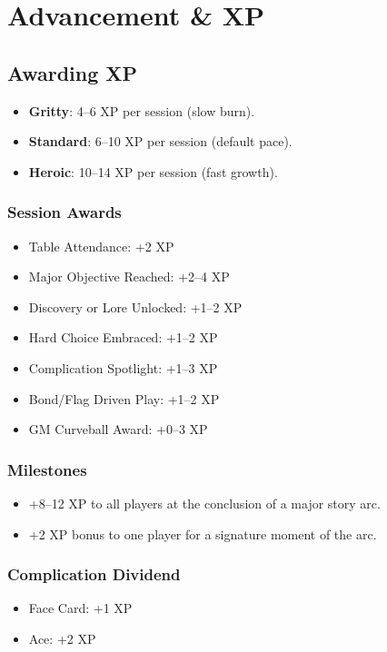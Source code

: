 \documentclass[11pt]{article}
\begin{document}
\section{Advancement \& XP}

\subsection{Awarding XP}
\begin{itemize}
    \item \textbf{Gritty}: 4–6 XP per session (slow burn).
    \item \textbf{Standard}: 6–10 XP per session (default pace).
    \item \textbf{Heroic}: 10–14 XP per session (fast growth).
\end{itemize}

\subsubsection{Session Awards}
\begin{itemize}
    \item Table Attendance: +2 XP
    \item Major Objective Reached: +2–4 XP
    \item Discovery or Lore Unlocked: +1–2 XP
    \item Hard Choice Embraced: +1–2 XP
    \item Complication Spotlight: +1–3 XP
    \item Bond/Flag Driven Play: +1–2 XP
    \item GM Curveball Award: +0–3 XP
\end{itemize}

\subsubsection{Milestones}
\begin{itemize}
    \item +8–12 XP to all players at the conclusion of a major story arc.
    \item +2 XP bonus to one player for a signature moment of the arc.
\end{itemize}

\subsubsection{Complication Dividend}
\begin{itemize}
    \item Face Card: +1 XP
    \item Ace: +2 XP
\end{itemize}
\end{document}
